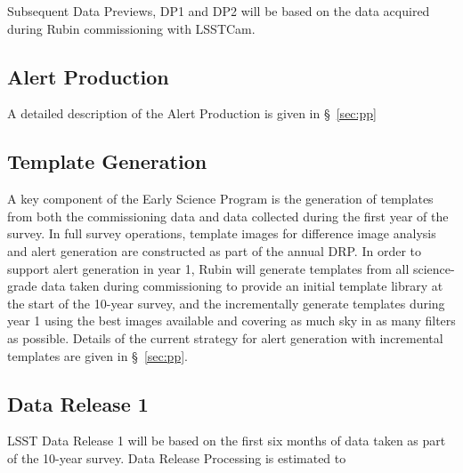 Subsequent Data Previews, DP1 and DP2 will be based on the data acquired during Rubin commissioning with LSSTCam.

\subsection{Alert Production}

A detailed description of the Alert Production is given in \S~\ref{sec:pp}

\subsection {Template Generation}

A key component of the Early Science Program is the generation of templates from both the commissioning data and data collected during the first year of the survey.
In full survey operations, template images for difference image analysis and alert generation are constructed as part of the annual DRP.
In order to support alert generation in year 1, Rubin will generate templates from all science-grade data taken during commissioning to provide an initial template library at the start of the 10-year survey, and the incrementally generate templates during year 1 using the best images available and covering as much sky in as many filters as possible.
Details of the current strategy for alert generation  with incremental templates are given in \S~\ref{sec:pp}.

\subsection{Data Release 1}

LSST Data Release 1 will be based on the first six months of data taken as part of the 10-year survey.
Data Release Processing is estimated to

